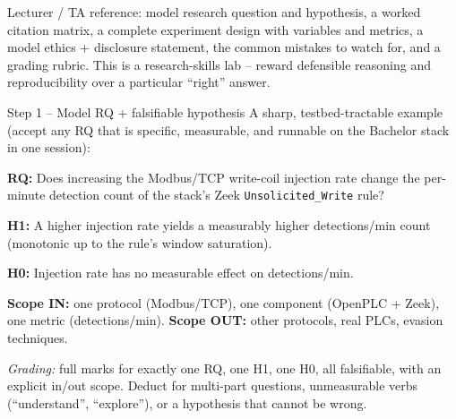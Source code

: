 \documentclass[11pt,a4paper]{article}
\begin{document}
\labheader

\begin{goalbox}
Lecturer / TA reference: model research question and hypothesis, a worked
citation matrix, a complete experiment design with variables and metrics,
a model ethics + disclosure statement, the common mistakes to watch for,
and a grading rubric. This is a research-skills lab -- reward defensible
reasoning and reproducibility over a particular ``right'' answer.
\end{goalbox}

\begin{solutionbox}{Step 1 -- Model RQ + falsifiable hypothesis}
A sharp, testbed-tractable example (accept any RQ that is specific,
measurable, and runnable on the Bachelor stack in one session):

\vspace{1mm}
\textbf{RQ:} Does increasing the Modbus/TCP write-coil injection rate
change the per-minute detection count of the stack's Zeek
\texttt{Unsolicited\_Write} rule?

\textbf{H1:} A higher injection rate yields a measurably higher
detections/min count (monotonic up to the rule's window saturation).

\textbf{H0:} Injection rate has no measurable effect on detections/min.

\textbf{Scope IN:} one protocol (Modbus/TCP), one component (OpenPLC +
Zeek), one metric (detections/min). \textbf{Scope OUT:} other protocols,
real PLCs, evasion techniques.

\vspace{1mm}
\emph{Grading:} full marks for exactly one RQ, one H1, one H0, all
falsifiable, with an explicit in/out scope. Deduct for multi-part
questions, unmeasurable verbs (``understand'', ``explore''), or a
hypothesis that cannot be wrong.
\end{solutionbox}
\end{document}
